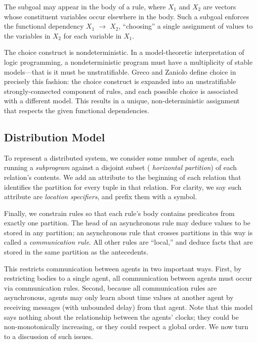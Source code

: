 The subgoal  may appear
in the body of a rule, where \emph{$X_1$} and \emph{$X_2$} are vectors
whose constituent variables occur elsewhere in the body.  Such a
subgoal enforces the functional dependency \emph{$X_1$} $\to$ $X_2$,
``choosing'' a single assignment of values to the variables in
\emph{$X_2$} for each variable in \emph{$X_1$}.

The choice construct is nondeterministic.  In a model-theoretic interpretation of logic programming, a nondeterministic program 
must have a multiplicity of stable models---that is it must be unstratifiable.  Greco and Zaniolo define 
choice in precisely this fashion: the choice construct is expanded into an unstratifiable strongly-connected component of rules, 
and each possible choice is associated with a different model.  This results in a unique, non-deterministic assignment that
respects the given functional dependencies.


\subsection{Distribution Model}
To represent a distributed system, we consider some number of agents,
each running a {\em subprogram} against a disjoint subset ({\em
  horizontal partition}) of each relation's contents.  We add an
attribute to the beginning of each relation that identifies the
partition for every tuple in that relation. For clarity, we say such
attribute are {\em location specifiers}, and prefix them with a
\dedalus{\#} symbol.

Finally, we constrain \lang rules so that each rule's body contains
predicates from exactly one partition.  The head of an asynchronous rule
may deduce values to be stored in any partition; an asynchronous rule
that crosses partitions in this way is called a {\em communication
  rule}.  All other rules are ``local,'' and deduce facts that are
stored in the same partition as the antecedents.

This restricts communication between agents in two important ways.
First, by restricting bodies to a single agent, all communication
between agents must occur via communication rules.  Second, because
all communication rules are asynchronous, agents may only learn about
time values at another agent by receiving messages (with unbounded
delay) from that agent.  Note that this model says nothing about the
relationship between the agents' clocks; they could be
non-monotonically increasing, or they could respect a global order.
We now turn to a discussion of such issues.

